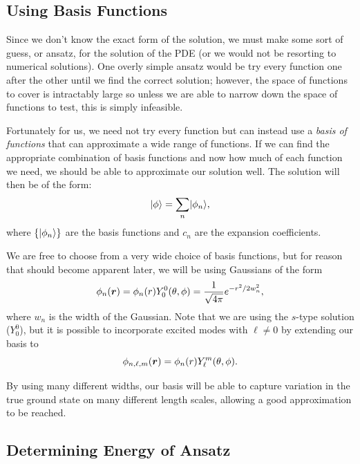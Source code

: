 \documentclass[
  a4paper,             %
  11pt,                %
  oneside,             %
  onecolumn,           %
  bibliography=totoc,  %
  final,               %
]{scrartcl}
\begin{document}
\subsection{Using Basis Functions}
\label{subsec:using_basis_functions}

Since we don't know the exact form of the solution, we must make some sort of
guess, or ansatz, for the solution of the \gls{PDE} (or we would not be
resorting to numerical solutions).  One overly simple ansatz would be try every
function one after the other until we find the correct solution; however, the
space of functions to cover is intractably large so unless we are able to narrow
down the space of functions to test, this is simply infeasible.

Fortunately for us, we need not try every function but can instead use a
\emph{basis of functions} that can approximate a wide range of functions.  If we
can find the appropriate combination of basis functions and now how much of each
function we need, we should be able to approximate our solution well.  The
solution will then be of the form:
\begin{equation}
  \label{eq:ansatz_definition}
  \ket{\phi} = \sum_{n} \ket{\phi_{n}},
\end{equation}
where \(\{\ket{\phi_{n}}\}\) are the basis functions and \(c_{n}\) are the
expansion coefficients.

We are free to choose from a very wide choice of basis functions, but for reason
that should become apparent later, we will be using Gaussians of the form
\begin{equation}
  \label{eq:basis_definition}
  \phi_{n}(\boldsymbol{r}) = \phi_{n}(r) Y^{0}_{0}(\theta,\phi)
  = \frac{1}{\sqrt{4\pi}} e^{- r^{2} / 2 w_{n}^{2}},
\end{equation}
where \(w_n\) is the width of the Gaussian.  Note that we are using the
\(s\)-type solution (\(Y^{0}_{0}\)), but it is possible to incorporate excited
modes with \(\ell \neq 0\) by extending our basis to
\begin{equation}
  \phi_{n,\ell,m}(\boldsymbol{r}) = \phi_{n}(r) Y^{m}_{\ell}(\theta,\phi).
\end{equation}

By using many different widths, our basis will be able to capture variation in
the true ground state on many different length scales, allowing a good
approximation to be reached.

\subsection{Determining Energy of Ansatz}
\label{subsec:determining_energy_of_ansatz}
\end{document}

